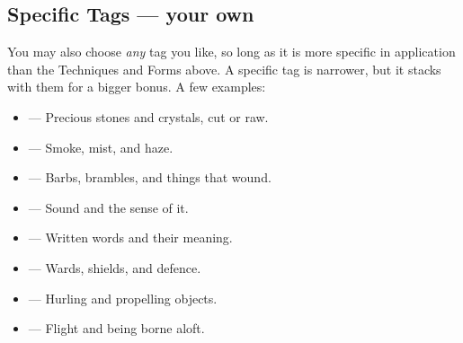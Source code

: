 \subsection*{Specific Tags --- your own}
You may also choose \emph{any} tag you like, so long as it is more specific
in application than the Techniques and Forms above. A specific tag is
narrower, but it stacks with them for a bigger bonus. A few examples:
\begin{itemize}
  \item {} --- Precious stones and crystals, cut or raw.
  \item {} --- Smoke, mist, and haze.
  \item {} --- Barbs, brambles, and things that wound.
  \item {} --- Sound and the sense of it.
  \item {} --- Written words and their meaning.
  \item {} --- Wards, shields, and defence.
  \item {} --- Hurling and propelling objects.
  \item {} --- Flight and being borne aloft.
\end{itemize}
